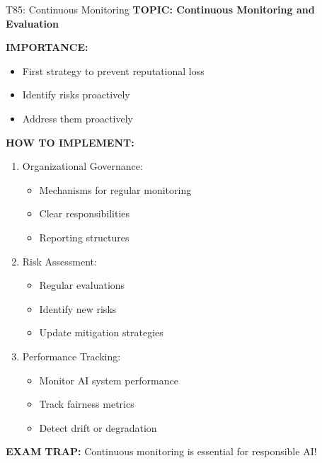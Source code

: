 \documentclass[8pt]{beamer}
\begin{document}
	\begin{frame}{T85: Continuous Monitoring}
		\fontsize{6.5}{7.5}\selectfont
		\textbf{TOPIC: Continuous Monitoring and Evaluation}
		
		\vspace{0.1cm}
		\textbf{IMPORTANCE:}
		\begin{itemize}
			\item First strategy to prevent reputational loss
			\item Identify risks proactively
			\item Address them proactively
		\end{itemize}
		
		\vspace{0.1cm}
		\textbf{HOW TO IMPLEMENT:}
		\begin{enumerate}
			\item \textcolor{myblue}{Organizational Governance:}
			\begin{itemize}
				\item Mechanisms for regular monitoring
				\item Clear responsibilities
				\item Reporting structures
			\end{itemize}
			\item \textcolor{myblue}{Risk Assessment:}
			\begin{itemize}
				\item Regular evaluations
				\item Identify new risks
				\item Update mitigation strategies
			\end{itemize}
			\item \textcolor{myblue}{Performance Tracking:}
			\begin{itemize}
				\item Monitor AI system performance
				\item Track fairness metrics
				\item Detect drift or degradation
			\end{itemize}
		\end{enumerate}
		
		\textcolor{myred}{\textbf{EXAM TRAP:}} Continuous monitoring is \textcolor{myblue}{essential for responsible AI}!
	\end{frame}
	
\end{document}
